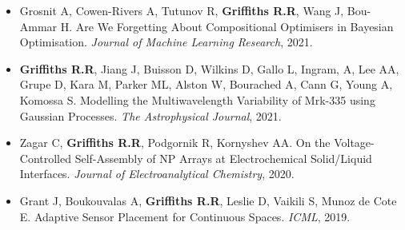 \documentclass[11pt]{article}
\begin{document}


\begin{itemize}

\item Grosnit A, Cowen-Rivers A, Tutunov R, \textbf{Griffiths R.R}, Wang J, Bou-Ammar H. Are We Forgetting About Compositional Optimisers in Bayesian Optimisation. \textit{Journal of Machine Learning Research}, 2021.

\end{itemize}
 


\begin{itemize}

\item \textbf{Griffiths R.R}, Jiang J, Buisson D, Wilkins D, Gallo L, Ingram, A, Lee AA, Grupe D, Kara M, Parker ML, Alston W, Bourached A, Cann G, Young A, Komossa S. Modelling the Multiwavelength Variability of Mrk-335 using Gaussian Processes. \textit{The Astrophysical Journal}, 2021.

\end{itemize}
 


\begin{itemize}

\item Zagar C, \textbf{Griffiths R.R}, Podgornik R, Kornyshev AA. On the Voltage-Controlled Self-Assembly of NP Arrays at Electrochemical Solid/Liquid Interfaces. \textit{Journal of Electroanalytical Chemistry}, 2020.

\end{itemize}
 


\begin{itemize}

\item Grant J, Boukouvalas A, \textbf{Griffiths R.R}, Leslie D, Vaikili S, Munoz de Cote E. Adaptive Sensor Placement for Continuous Spaces. \textit{ICML}, 2019.

\end{itemize}
 
\end{document}
